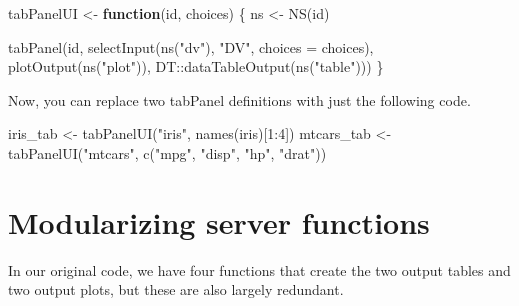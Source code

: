 \documentclass[
  oneside]{book}
\newenvironment{Shaded}{\begin{snugshade}}{\end{snugshade}}
\newcommand{\AttributeTok}[1]{\textcolor[rgb]{0.77,0.63,0.00}{#1}}
\newcommand{\ControlFlowTok}[1]{\textcolor[rgb]{0.13,0.29,0.53}{\textbf{#1}}}
\newcommand{\DecValTok}[1]{\textcolor[rgb]{0.00,0.00,0.81}{#1}}
\newcommand{\FunctionTok}[1]{\textcolor[rgb]{0.00,0.00,0.00}{#1}}
\newcommand{\NormalTok}[1]{#1}
\newcommand{\OtherTok}[1]{\textcolor[rgb]{0.56,0.35,0.01}{#1}}
\newcommand{\SpecialCharTok}[1]{\textcolor[rgb]{0.00,0.00,0.00}{#1}}
\newcommand{\StringTok}[1]{\textcolor[rgb]{0.31,0.60,0.02}{#1}}
\begin{document}
\begin{Shaded}
\begin{Highlighting}[]
\NormalTok{tabPanelUI }\OtherTok{\textless{}{-}} \ControlFlowTok{function}\NormalTok{(id, choices) \{}
\NormalTok{    ns }\OtherTok{\textless{}{-}} \FunctionTok{NS}\NormalTok{(id)}

    \FunctionTok{tabPanel}\NormalTok{(id, }\FunctionTok{selectInput}\NormalTok{(}\FunctionTok{ns}\NormalTok{(}\StringTok{"dv"}\NormalTok{), }\StringTok{"DV"}\NormalTok{, }\AttributeTok{choices =}\NormalTok{ choices), }\FunctionTok{plotOutput}\NormalTok{(}\FunctionTok{ns}\NormalTok{(}\StringTok{"plot"}\NormalTok{)),}
\NormalTok{        DT}\SpecialCharTok{::}\FunctionTok{dataTableOutput}\NormalTok{(}\FunctionTok{ns}\NormalTok{(}\StringTok{"table"}\NormalTok{)))}
\NormalTok{\}}
\end{Highlighting}
\end{Shaded}

Now, you can replace two tabPanel definitions with just the following code.

\begin{Shaded}
\begin{Highlighting}[]
\NormalTok{iris\_tab }\OtherTok{\textless{}{-}} \FunctionTok{tabPanelUI}\NormalTok{(}\StringTok{"iris"}\NormalTok{, }\FunctionTok{names}\NormalTok{(iris)[}\DecValTok{1}\SpecialCharTok{:}\DecValTok{4}\NormalTok{])}
\NormalTok{mtcars\_tab }\OtherTok{\textless{}{-}} \FunctionTok{tabPanelUI}\NormalTok{(}\StringTok{"mtcars"}\NormalTok{, }\FunctionTok{c}\NormalTok{(}\StringTok{"mpg"}\NormalTok{, }\StringTok{"disp"}\NormalTok{, }\StringTok{"hp"}\NormalTok{, }\StringTok{"drat"}\NormalTok{))}
\end{Highlighting}
\end{Shaded}

\hypertarget{modularizing-server-functions}{%
\section{Modularizing server functions}\label{modularizing-server-functions}}

In our original code, we have four functions that create the two output tables and two output plots, but these are also largely redundant.
\end{document}

